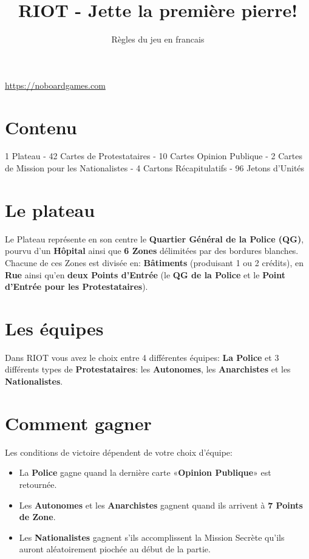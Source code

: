 \documentclass[a4paper,13pt]{scrartcl}
\title{RIOT - Jette la première pierre!}
\subtitle{Règles du jeu en francais}
\author{}
\date{}
\begin{document}
\maketitle

\url{https://noboardgames.com} 


\section*{Contenu}
1 Plateau - 42 Cartes de Protestataires - 10 Cartes Opinion Publique - 2 Cartes de Mission pour les Nationalistes - 4 Cartons Récapitulatifs - 96 Jetons d'Unités

\section*{Le plateau}
Le Plateau représente en son centre le \textbf{Quartier Général de la Police (QG)}, pourvu d'un \textbf{Hôpital} ainsi que \textbf{6 Zones} délimitées par des bordures blanches. Chacune de ces Zones est divisée en: \textbf{Bâtiments} (produisant 1 ou 2 crédits), en \textbf{Rue} ainsi qu'en \textbf{deux Points d'Entrée} (le\textbf{ QG de la Police} et le \textbf{Point d'Entrée pour les Protestataires}).


\section*{Les équipes}
Dans RIOT vous avez le choix entre 4 différentes équipes: \textbf{La Police} et 3 différents types de \textbf{Protestataires}: les \textbf{Autonomes}, les \textbf{Anarchistes} et les \textbf{Nationalistes}.

\section*{Comment gagner}
Les conditions de victoire dépendent de votre choix d'équipe:
\begin{itemize}
\item La \textbf{Police} gagne quand la dernière carte «\textbf{Opinion Publique}» est retournée.
\item Les \textbf{Autonomes} et les \textbf{Anarchistes} gagnent quand ils arrivent à \textbf{7 Points de Zone}.
\item Les \textbf{Nationalistes} gagnent s'ils accomplissent la Mission Secrète qu'ils auront aléatoirement piochée au début de la partie.
\end{itemize}
\end{document}
